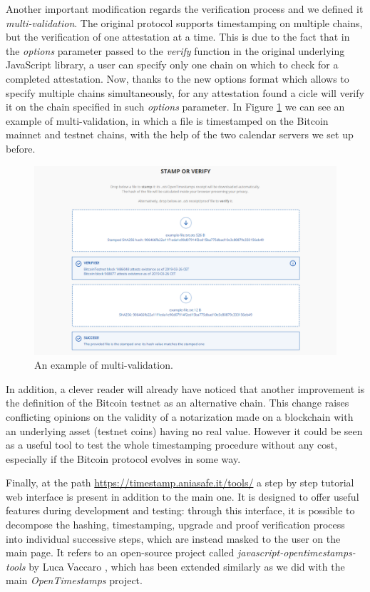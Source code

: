 \bigskip
\noindent
Another important modification regards the verification process and we defined it \textit{multi-validation}. The original protocol supports timestamping on multiple chains, but the verification of one attestation at a time. This is due to the fact that in the \textit{options} parameter passed to the \textit{verify} function in the original underlying JavaScript library, a user can specify only one chain on which to check for a completed attestation. Now, thanks to the new options format which allows to specify multiple chains simultaneously, for any attestation found a cicle will verify it on the chain specified in such \textit{options} parameter. In Figure \ref{fig:multivalidation} we can see an example of multi-validation, in which a file is timestamped on the Bitcoin mainnet and testnet chains, with the help of the two calendar servers we set up before.

\begin{figure}[ht]
    \centering
	\includegraphics[width=1\linewidth]{Images/multivalidation.png}
	\caption{An example of multi-validation.}
	\label{fig:multivalidation}
\end{figure}

\bigskip
\noindent
In addition, a clever reader will already have noticed that another improvement is the definition of the Bitcoin testnet as an alternative chain. This change raises conflicting opinions on the validity of a notarization made on a blockchain with an underlying asset (testnet coins) having no real value. However it could be seen as a useful tool to test the whole timestamping procedure without any cost, especially if the Bitcoin protocol evolves in some way.

\bigskip
\noindent
Finally, at the path \url{https://timestamp.aniasafe.it/tools/} a step by step tutorial 
web interface is present in addition to the main one. It is designed to offer useful features during development and testing: through this interface, it is possible to decompose the hashing, timestamping, upgrade and proof verification process into individual successive steps, which are instead masked to the user on the main page. It refers to an open-source project called \textit{javascript-opentimestamps-tools} by Luca Vaccaro \cite{OTStools}, which has been extended similarly as we did with the main \textit{OpenTimestamps} project.
